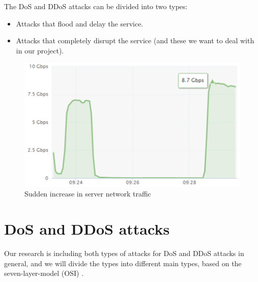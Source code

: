 \documentclass{report}
\begin{document}
\hfill \break The DoS and DDoS attacks can be divided into two types: 
\begin{itemize}
\item 	Attacks that flood and delay the service.
\item	Attacks that completely disrupt the service (and these we want to deal with in our project).

\end{itemize}
\begin{figure}
  \centering
        \includegraphics{ddos-attack-traffic-gbps}
	\caption{Sudden increase in server network traffic}
    \end{figure}

\section{DoS and DDoS attacks}
Our research is including both types of attacks for DoS and DDoS attacks in general, and we will divide the types into different main types, based on the seven-layer-model (OSI) \cite{QuickGuide}.
\end{document}
